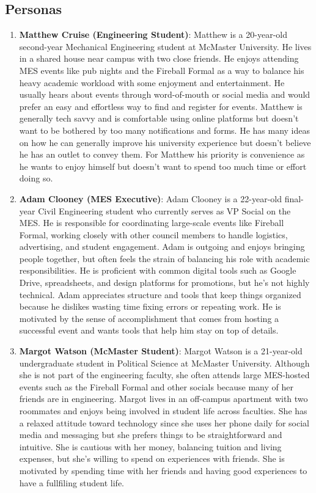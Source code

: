 \documentclass[12pt]{article}
\begin{document}
\subsection{Personas}
\begin{enumerate}
  \item \textbf{Matthew Cruise (Engineering Student)}: Matthew is a 20-year-old second-year Mechanical Engineering student at McMaster University. He lives in a shared house near campus with two close friends. He enjoys attending MES events like pub nights and the Fireball Formal as a way to balance his heavy academic workload with some enjoyment and entertainment. He usually hears about events through word-of-mouth or social media and would prefer an easy and effortless way to find and register for events. Matthew is generally tech savvy and is comfortable using online platforms but doesn't want to be bothered by too many notifications and forms. He has many ideas on how he can generally improve his university experience but doesn't believe he has an outlet to convey them. For Matthew his priority is convenience as he wants to enjoy himself but doesn't want to spend too much time or effort doing so.
  \item \textbf{Adam Clooney (MES Executive)}: Adam Clooney is a 22-year-old final-year Civil Engineering student who currently serves as VP Social on the MES. He is responsible for coordinating large-scale events like Fireball Formal, working closely with other council members to handle logistics, advertising, and student engagement. Adam is outgoing and enjoys bringing people together, but often feels the strain of balancing his role with academic responsibilities. He is proficient with common digital tools such as Google Drive, spreadsheets, and design platforms for promotions, but he’s not highly technical. Adam appreciates structure and tools that keep things organized because he dislikes wasting time fixing errors or repeating work. He is motivated by the sense of accomplishment that comes from hosting a successful event and wants tools that help him stay on top of details.
  \item \textbf{Margot Watson (McMaster Student)}: Margot Watson is a 21-year-old undergraduate student in Political Science at McMaster University. Although she is not part of the engineering faculty, she often attends large MES-hosted events such as the Fireball Formal and other socials because many of her friends are in engineering. Margot lives in an off-campus apartment with two roommates and enjoys being involved in student life across faculties. She has a relaxed attitude toward technology since she uses her phone daily for social media and messaging but she prefers things to be straightforward and intuitive. She is cautious with her money, balancing tuition and living expenses, but she’s willing to spend on experiences with friends. She is motivated by spending time with her friends and having good experiences to have a fullfiling student life.
\end{enumerate}
\end{document}
